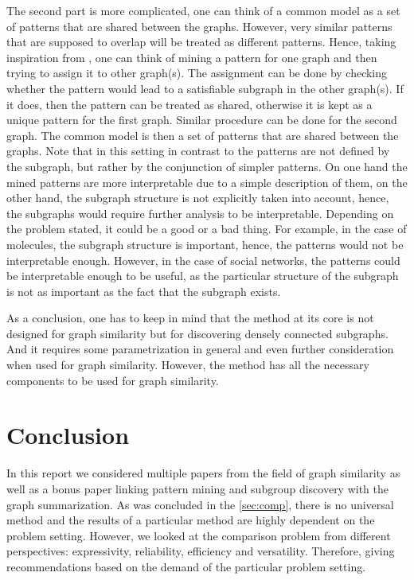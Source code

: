 \documentclass{article}
\begin{document}
The second part is more complicated, one can think of a common model as a set of patterns that are shared between the graphs. However, very similar patterns that are supposed to overlap will be treated as different patterns. Hence, taking inspiration from \cite{coupette2022gragra}, one can think of mining a pattern for one graph and then trying to assign it to other graph(s). The assignment can be done by checking whether the pattern would lead to a satisfiable subgraph in the other graph(s). If it does, then the pattern can be treated as shared, otherwise it is kept as a unique pattern for the first graph. Similar procedure can be done for the second graph. The common model is then a set of patterns that are shared between the graphs. Note that in this setting in contrast to \cite{coupette2022gragra} the patterns are not defined by the subgraph, but rather by the conjunction of simpler patterns. On one hand the mined patterns are more interpretable due to a simple description of them, on the other hand, the subgraph structure is not explicitly taken into account, hence, the subgraphs would require further analysis to be interpretable. Depending on the problem stated, it could be a good or a bad thing. For example, in the case of molecules, the subgraph structure is important, hence, the patterns would not be interpretable enough. However, in the case of social networks, the patterns could be interpretable enough to be useful, as the particular structure of the subgraph is not as important as the fact that the subgraph exists.

As a conclusion, one has to keep in mind that the method at its core is not designed for graph similarity but for discovering densely connected subgraphs. And it requires some parametrization in general and even further consideration when used for graph similarity. However, the method has all the necessary components to be used for graph similarity.

\section{Conclusion}
In this report we considered multiple papers from the field of graph similarity as well as a bonus paper linking pattern mining and subgroup discovery with the graph summarization. As was concluded in the \autoref{sec:comp}, there is no universal method and the results of a particular method are highly dependent on the problem setting. However, we looked at the comparison problem from different perspectives: expressivity, reliability, efficiency and versatility. Therefore, giving recommendations based on the demand of the particular problem setting. 

	

\end{document}

